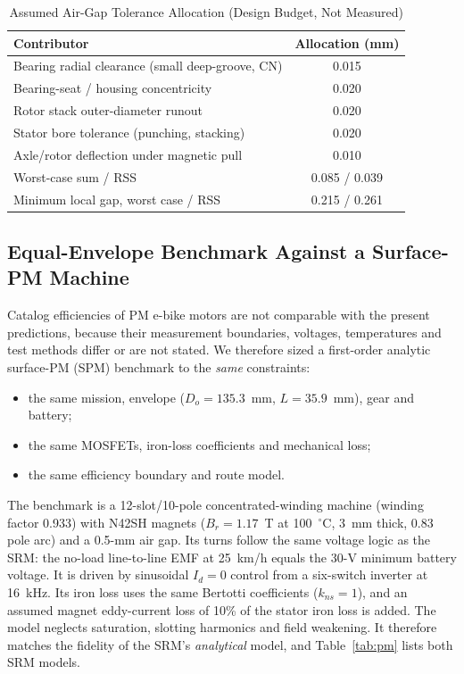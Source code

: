 \documentclass[journal]{IEEEtran}
\begin{document}
\begin{table}[!t]
\caption{Assumed Air-Gap Tolerance Allocation (Design Budget, Not Measured)}
\label{tab:stack}
\centering
\renewcommand{\arraystretch}{1.08}
\begin{tabular}{l c}
\hline
Contributor & Allocation (mm)\\
\hline
Bearing radial clearance (small deep-groove, CN) & 0.015\\
Bearing-seat / housing concentricity & 0.020\\
Rotor stack outer-diameter runout & 0.020\\
Stator bore tolerance (punching, stacking) & 0.020\\
Axle/rotor deflection under magnetic pull & 0.010\\
\hline
Worst-case sum / RSS & 0.085 / 0.039\\
Minimum local gap, worst case / RSS & 0.215 / 0.261\\
\hline
\end{tabular}
\end{table}

\subsection{Equal-Envelope Benchmark Against a Surface-PM Machine}
\label{sec:pm}
Catalog efficiencies of PM e-bike motors are not comparable with the present
predictions, because their measurement boundaries, voltages, temperatures and
test methods differ or are not stated. We therefore sized a first-order
analytic surface-PM (SPM) benchmark to the \emph{same} constraints:
\begin{itemize}
\item the same mission, envelope ($D_o=135.3$~mm, $L=35.9$~mm), gear and
battery;
\item the same MOSFETs, iron-loss coefficients and mechanical loss;
\item the same efficiency boundary and route model.
\end{itemize}
The benchmark is a 12-slot/10-pole concentrated-winding machine (winding factor
0.933) with N42SH magnets ($B_r=1.17$~T at 100~$^\circ$C, 3~mm thick, 0.83 pole
arc) and a 0.5-mm air gap. Its turns follow the same voltage logic as the SRM:
the no-load line-to-line EMF at 25~km/h equals the 30-V minimum battery voltage.
It is driven by sinusoidal $I_d=0$ control from a six-switch inverter at
16~kHz. Its iron loss uses the same Bertotti coefficients ($k_{ns}=1$), and an
assumed magnet eddy-current loss of 10\% of the stator iron loss is added. The
model neglects saturation, slotting harmonics and field weakening. It
therefore matches the fidelity of the SRM's \emph{analytical} model, and
Table~\ref{tab:pm} lists both SRM models.
\end{document}
